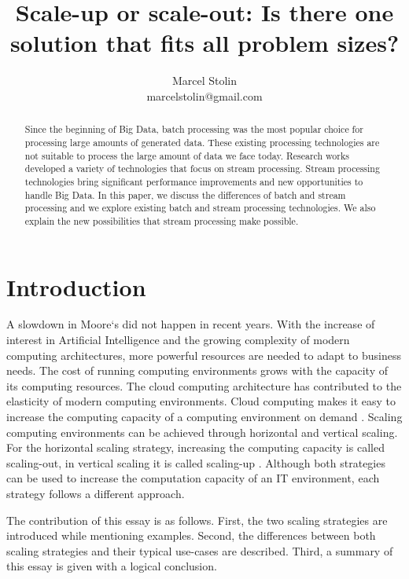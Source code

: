 \documentclass{article}
\title{Scale-up or scale-out: Is there one solution that fits all problem sizes?}
\date{}
\author{Marcel Stolin \\ marcelstolin@gmail.com}
\begin{document}
\maketitle


\begin{abstract}
Since the beginning of Big Data, batch processing was the most popular choice for processing large amounts of generated data. These existing processing technologies are not suitable to process the large amount of data we face today. Research works developed a variety of technologies that focus on stream processing. Stream processing technologies bring significant performance improvements and new opportunities to handle Big Data. In this paper, we discuss the differences of batch and stream processing and we explore existing batch and stream processing technologies. We also explain the new possibilities that stream processing make possible.
\end{abstract}


\section{Introduction} \label{s_intro}
A slowdown in Moore`s did not happen in recent years. With the increase of interest in Artificial Intelligence and the growing complexity of modern computing architectures, more powerful resources are needed to adapt to business needs. The cost of running computing environments grows with the capacity of its computing resources.
The cloud computing architecture has contributed to the elasticity of modern computing environments. Cloud computing makes it easy to increase the computing capacity of a computing environment on demand \cite{Mahmood2013CloudConcepts}. Scaling computing environments can be achieved through horizontal and vertical scaling. For the horizontal scaling strategy, increasing the computing capacity is called scaling-out, in vertical scaling it is called scaling-up \cite{Abbott2015ScalabilityArt}.
Although both strategies can be used to increase the computation capacity of an IT environment, each strategy follows a different approach.


The contribution of this essay is as follows. First, the two scaling strategies are introduced while mentioning examples. Second, the differences between both scaling strategies and their typical use-cases are described. Third, a summary of this essay is given with a logical conclusion.
\end{document}
